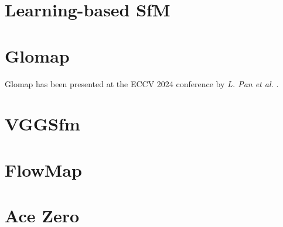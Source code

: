\section{Learning-based SfM}


\section{Glomap}

Glomap has been presented at the ECCV 2024 conference by \textit{L. Pan et al.} \cite{pan2024glomap}.


\section{VGGSfm}


\section{FlowMap}


\section{Ace Zero}
